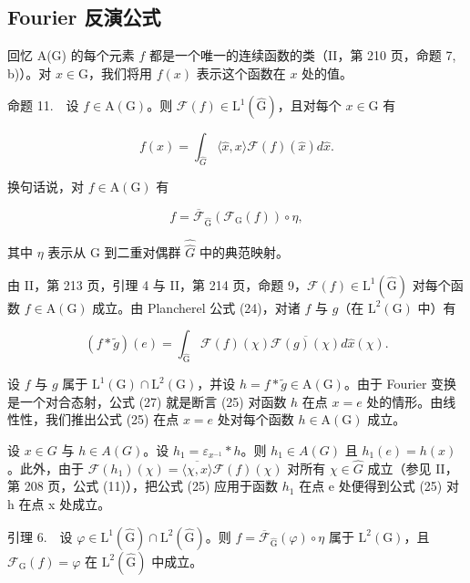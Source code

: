 \subsection{Fourier 反演公式}

回忆 A(G) 的每个元素 \(f\) 都是一个唯一的连续函数的类（II，第 210 页，命题 7, b)）。对 \(x \in \mathrm{G}\)，我们将用 \(f(x)\) 表示这个函数在 \(x\) 处的值。

命题 11.　设 \(f \in \mathrm{A}(\mathrm{G})\)。则 \(\mathcal{F}(f) \in \mathrm{L}^1(\widehat{\mathrm{G}})\)，且对每个 \(x \in \mathrm{G}\) 有

\[
f (x) = \int_ {\widehat {G}} \langle \widehat {x}, x \rangle \mathcal {F} (f) (\widehat {x}) d \widehat {x}.\tag{25}
\]

换句话说，对 \(f \in \mathrm{A}(\mathrm{G})\) 有

\[
f = \overline {{\mathcal {F}}} _ {\widehat {\mathrm{G}}} (\mathcal {F} _ {\mathrm{G}} (f)) \circ \eta ,\tag{26}
\]

其中 \(\eta\) 表示从 G 到二重对偶群 \(\widehat{\widehat{G}}\) 中的典范映射。

由 II，第 213 页，引理 4 与 II，第 214 页，命题 9，\(\mathcal{F}(f) \in \mathrm{L}^1(\widehat{\mathrm{G}})\) 对每个函数 \(f \in \mathrm{A}(\mathrm{G})\) 成立。由 Plancherel 公式 (24)，对诸 \(f\) 与 \(g\)（在 \(\mathrm{L}^2(\mathrm{G})\) 中）有

\[
(f * \widetilde {g}) (e) = \int_ {\widehat {\mathrm{G}}} \mathcal {F} (f) (\chi) \overline {{\mathcal {F} (g) (\chi)}} d \widehat {x} (\chi).\tag{27}
\]

设 \(f\) 与 \(g\) 属于 \(\mathrm{L}^1(\mathrm{G}) \cap \mathrm{L}^2(\mathrm{G})\)，并设 \(h = f * \widetilde{g} \in \mathrm{A}(\mathrm{G})\)。由于 Fourier 变换是一个对合态射，公式 (27) 就是断言 (25) 对函数 \(h\) 在点 \(x = e\) 处的情形。由线性性，我们推出公式 (25) 在点 \(x = e\) 处对每个函数 \(h \in \mathrm{A}(\mathrm{G})\) 成立。

设 \(x \in G\) 与 \(h \in A(G)\)。设 \(h_{1} = \varepsilon_{x^{-1}} * h\)。则 \(h_{1} \in A(G)\) 且 \(h_{1}(e) = h(x)\)。此外，由于 \(\mathcal{F}(h_{1})(\chi) = \overline{\langle\chi, x\rangle}\mathcal{F}(f)(\chi)\) 对所有 \(\chi \in \widehat{G}\) 成立（参见 II，第 208 页，公式 (11)），把公式 (25) 应用于函数 \(h_{1}\) 在点 e 处便得到公式 (25) 对 h 在点 x 处成立。

引理 6.　设 \(\varphi\in\mathrm{L}^{1}(\widehat{\mathrm{G}})\cap\mathrm{L}^{2}(\widehat{\mathrm{G}})\)。则 \(f=\overline{\mathcal{F}}_{\widehat{\mathrm{G}}}(\varphi)\circ\eta\) 属于 \(\mathrm{L}^{2}(\mathrm{G})\)，且 \(\mathcal{F}_{\mathrm{G}}(f)=\varphi\) 在 \(\mathrm{L}^{2}(\widehat{\mathrm{G}})\) 中成立。

